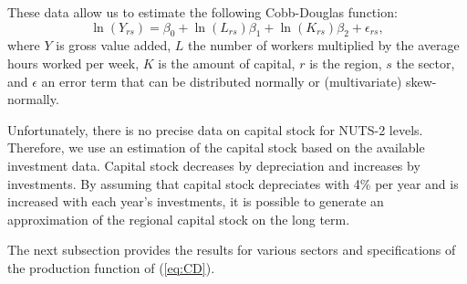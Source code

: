 \documentclass[11pt,parskip,abstracton,notitlepage]{scrartcl}
\begin{document}
These data allow us to estimate the following Cobb-Douglas function:
\begin{equation}
\ln \left(Y_{rs}\right) = \beta_0 + \ln({L}_{rs}) \beta_1 + \ln({K}_{rs})\beta_2 + \epsilon_{rs},
\label{eq:CD}
\end{equation}
where $Y$ is gross value added, $L$ the number of workers multiplied by the average hours worked per week, $K$ is the amount of capital, $r$ is the region, $s$ the sector, and $\epsilon$ an error term that can be distributed normally or (multivariate) skew-normally.

Unfortunately, there is no precise data on capital stock for NUTS-2 levels. Therefore, we use an estimation of the capital stock based on the available investment data. Capital stock
decreases by depreciation and increases by investments. By assuming that capital stock
depreciates with 4\% per year and is increased with each year's investments, it is possible to
generate an approximation of the regional capital stock on the long term. 

The next subsection provides the results for various sectors and specifications of the production function of (\ref{eq:CD}). 
%
\end{document}
